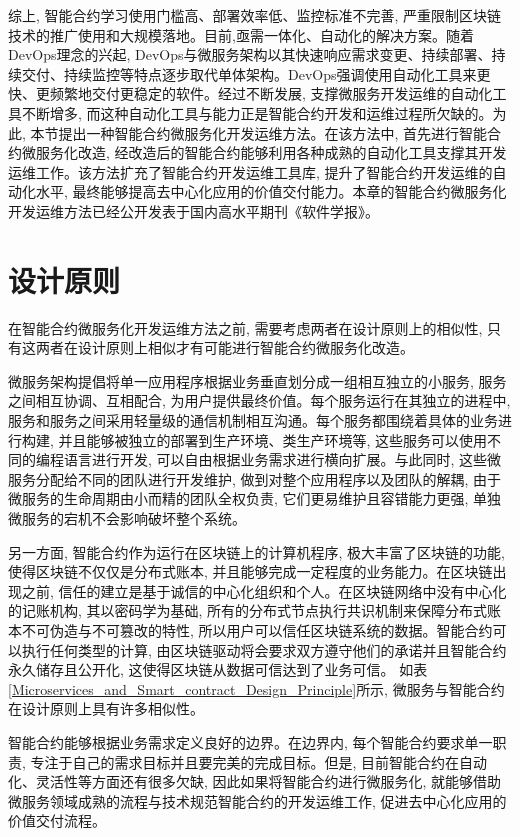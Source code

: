综上, 智能合约学习使用门槛高、部署效率低、监控标准不完善, 严重限制区块链技术的推广使用和大规模落地。目前,亟需一体化、自动化的解决方案。随着DevOps理念的兴起, DevOps与微服务架构以其快速响应需求变更、持续部署、持续交付、持续监控等特点逐步取代单体架构。DevOps强调使用自动化工具来更快、更频繁地交付更稳定的软件。经过不断发展, 支撑微服务开发运维的自动化工具不断增多, 而这种自动化工具与能力正是智能合约开发和运维过程所欠缺的。为此, 本节提出一种智能合约微服务化开发运维方法。在该方法中, 首先进行智能合约微服务化改造, 经改造后的智能合约能够利用各种成熟的自动化工具支撑其开发运维工作。该方法扩充了智能合约开发运维工具库, 提升了智能合约开发运维的自动化水平, 最终能够提高去中心化应用的价值交付能力。本章的智能合约微服务化开发运维方法已经公开发表于国内高水平期刊《软件学报》。

\section{设计原则}

在智能合约微服务化开发运维方法之前, 需要考虑两者在设计原则上的相似性, 只有这两者在设计原则上相似才有可能进行智能合约微服务化改造。

微服务架构提倡将单一应用程序根据业务垂直划分成一组相互独立的小服务, 服务之间相互协调、互相配合, 为用户提供最终价值。每个服务运行在其独立的进程中, 服务和服务之间采用轻量级的通信机制相互沟通。每个服务都围绕着具体的业务进行构建, 并且能够被独立的部署到生产环境、类生产环境等, 这些服务可以使用不同的编程语言进行开发, 可以自由根据业务需求进行横向扩展。与此同时, 这些微服务分配给不同的团队进行开发维护, 做到对整个应用程序以及团队的解耦, 由于微服务的生命周期由小而精的团队全权负责, 它们更易维护且容错能力更强, 单独微服务的宕机不会影响破坏整个系统。

另一方面, 智能合约作为运行在区块链上的计算机程序, 极大丰富了区块链的功能, 使得区块链不仅仅是分布式账本, 并且能够完成一定程度的业务能力。在区块链出现之前, 信任的建立是基于诚信的中心化组织和个人。在区块链网络中没有中心化的记账机构, 其以密码学为基础, 所有的分布式节点执行共识机制来保障分布式账本不可伪造与不可篡改的特性, 所以用户可以信任区块链系统的数据。智能合约可以执行任何类型的计算, 由区块链驱动将会要求双方遵守他们的承诺并且智能合约永久储存且公开化, 这使得区块链从数据可信达到了业务可信。 如表\ref{Microservices_and_Smart_contract_Design_Principle}所示, 微服务与智能合约在设计原则上具有许多相似性\cite{weber2018blockchain}。

智能合约能够根据业务需求定义良好的边界。在边界内, 每个智能合约要求单一职责, 专注于自己的需求目标并且要完美的完成目标。但是, 目前智能合约在自动化、灵活性等方面还有很多欠缺, 因此如果将智能合约进行微服务化, 就能够借助微服务领域成熟的流程与技术规范智能合约的开发运维工作, 促进去中心化应用的价值交付流程。

